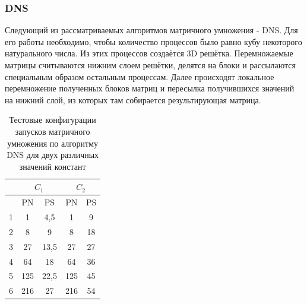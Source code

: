 		\subsubsection{DNS}
			Следующий из рассматриваемых алгоритмов матричного умножения - DNS. Для его работы необходимо, чтобы количество процессов было равно кубу некоторого натурального числа. Из этих процессов создаётся 3D решётка. Перемножаемые матрицы считываются нижним слоем решётки, делятся на блоки и рассылаются специальным образом остальным процессам. Далее происходят локальное перемножение полученных блоков матриц и пересылка получившихся значений на нижний слой, из которых там собирается результирующая матрица.
			\begin{table}
				\centering
				\begin{tabular}{|r||c|c||c|c|}
					\hline
					            & \multicolumn{2}{c||}{\(C_1\)} & \multicolumn{2}{c|}{\(C_2\)}  \\ \hline
					\textnumero & PN  & PS                      & PN  & PS                      \\ \hline
					1           & 1   & 4,5                     & 1   & 9                       \\ \hline
					2           & 8   & 9                       & 8   & 18                      \\ \hline
					3           & 27  & 13,5                    & 27  & 27                      \\ \hline
					4           & 64  & 18                      & 64  & 36                      \\ \hline
					5           & 125 & 22,5                    & 125 & 45                      \\ \hline
					6           & 216 & 27                      & 216 & 54                      \\ \hline
				\end{tabular}
				\caption{Тестовые конфигурации запусков матричного умножения по алгоритму DNS для двух различных значений констант}
				\label{test_DNS}
			\end{table}
